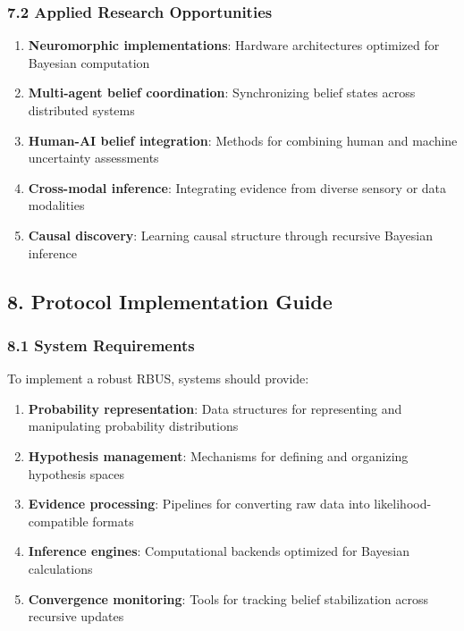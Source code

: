 \documentclass[
]{article}
\providecommand{\tightlist}{%
  \setlength{\itemsep}{0pt}\setlength{\parskip}{0pt}}
\begin{document}
\subsubsection{7.2 Applied Research
Opportunities}\label{applied-research-opportunities-1}

\begin{enumerate}
\def\labelenumi{\arabic{enumi}.}
\tightlist
\item
  \textbf{Neuromorphic implementations}: Hardware architectures
  optimized for Bayesian computation
\item
  \textbf{Multi-agent belief coordination}: Synchronizing belief states
  across distributed systems
\item
  \textbf{Human-AI belief integration}: Methods for combining human and
  machine uncertainty assessments
\item
  \textbf{Cross-modal inference}: Integrating evidence from diverse
  sensory or data modalities
\item
  \textbf{Causal discovery}: Learning causal structure through recursive
  Bayesian inference
\end{enumerate}

\subsection{8. Protocol Implementation
Guide}\label{protocol-implementation-guide-1}

\subsubsection{8.1 System Requirements}\label{system-requirements-1}

To implement a robust RBUS, systems should provide:

\begin{enumerate}
\def\labelenumi{\arabic{enumi}.}
\tightlist
\item
  \textbf{Probability representation}: Data structures for representing
  and manipulating probability distributions
\item
  \textbf{Hypothesis management}: Mechanisms for defining and organizing
  hypothesis spaces
\item
  \textbf{Evidence processing}: Pipelines for converting raw data into
  likelihood-compatible formats
\item
  \textbf{Inference engines}: Computational backends optimized for
  Bayesian calculations
\item
  \textbf{Convergence monitoring}: Tools for tracking belief
  stabilization across recursive updates
\end{enumerate}
\end{document}

